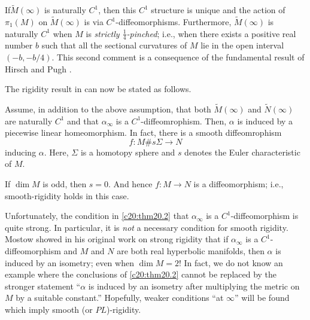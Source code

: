 \begin{remarks*}
If\pageoriginale $\tilde{M}(\infty)$ is naturally $C^{1}$, then this
$C^{1}$ structure is unique and the action of $\pi_{1}(M)$ on
$\tilde{M}(\infty)$ is via $C^{1}$-diffeomorphisms. Furthermore,
$\tilde{M}(\infty)$ is naturally $C^{1}$ when $M$ is {\em strictly
  $\frac{1}{4}$-pinched}; i.e., when there exists a positive real
number $b$ such that all the sectional curvatures of $M$ lie in the
open interval $(-b,-b/4)$. This second comment is a consequence of the
fundamental result of Hirsch and Pugh \cite{61}.
\end{remarks*}

The rigidity result in \cite{49} can now be stated as follows.

\begin{thm}\label{c20:thm20.2}
Assume, in addition to the above assumption, that both
$\tilde{M}(\infty)$ and $\tilde{N}(\infty)$ are naturally $C^{1}$ and
that $\alpha_{\infty}$ is a $C^{1}$-diffeomrophism. Then, $\alpha$ is
induced by a piecewise linear homeomorphism. In fact, there is a
smooth diffeomrophism
$$
f:M\# s\Sigma\to N
$$
inducing $\alpha$. Here, $\Sigma$ is a homotopy sphere and $s$ denotes
the Euler characteristic of $M$.
\end{thm}

\begin{remark*}
If $\dim M$ is odd, then $s=0$. And hence $f:M\to N$ is a
diffeomorphism; i.e., smooth-rigidity holds in this case.
\end{remark*}

Unfortunately, the condition in \ref{c20:thm20.2} that
$\alpha_{\infty}$ is a $C^{1}$-diffeomorphism is quite strong. In
particular, it is {\em not} a necessary condition for smooth
rigidity. Mostow showed in his original work on strong rigidity
\cite{74} that if $\alpha_{\infty}$ is a $C^{1}$-diffeomorphism and
$M$ and $N$ are both real hyperbolic manifolds, then $\alpha$ is
induced by an isometry; even when $\dim M=2!$ In fact, we do not know
an example where the conclusions of \ref{c20:thm20.2} cannot be
replaced by the stronger statement ``$\alpha$ is induced by an
isometry after multiplying the metric on $M$ by a suitable constant.''
Hopefully, weaker conditions ``at $\infty$'' will be found which imply
smooth (or $PL$)-rigidity.

